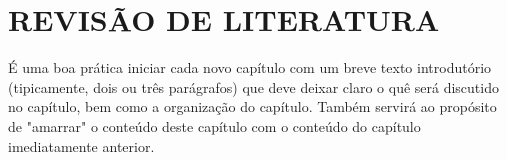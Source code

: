 
\chapter{REVISÃO DE LITERATURA}
\label{chap:fundamentacaoTeorica}

É uma boa prática iniciar cada novo capítulo com um breve texto introdutório (tipicamente, dois ou três parágrafos) que deve deixar claro o quê será discutido no capítulo, bem como a organização do capítulo.
Também servirá ao propósito de "amarrar"{} o conteúdo deste capítulo com o conteúdo do capítulo imediatamente anterior.
